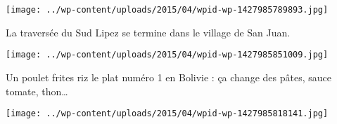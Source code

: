  \newline
\centerline{\texttt{[image: ../wp-content/uploads/2015/04/wpid-wp-1427985789893.jpg]} } 
 \newline
 La traversée du Sud Lipez se termine dans le village de San Juan. \newline
 \newline
\centerline{\texttt{[image: ../wp-content/uploads/2015/04/wpid-wp-1427985851009.jpg]} } 
 \newline
 Un poulet frites riz le plat numéro 1 en Bolivie : ça change des pâtes, sauce tomate, thon… \newline
 \newline
\centerline{\texttt{[image: ../wp-content/uploads/2015/04/wpid-wp-1427985818141.jpg]} } 
 \newline

\newpage
 
